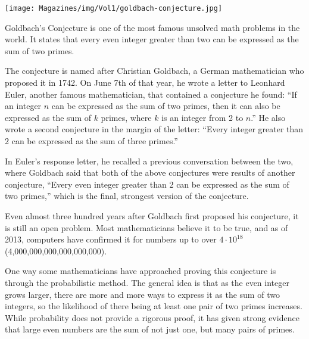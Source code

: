 \documentclass{article}
\begin{document}
\begin{multicols}{3}{


\begin{center}
    \texttt{[image: Magazines/img/Vol1/goldbach-conjecture.jpg]}
\end{center}

Goldbach’s Conjecture is one of the most famous unsolved math problems in the world. It states that every even integer greater than two can be expressed as the sum of two primes. 

The conjecture is named after Christian Goldbach, a German mathematician who proposed it in 1742. On June 7th of that year, he wrote a letter to Leonhard Euler, another famous mathematician, that contained a conjecture he found: ``If an integer $n$ can be expressed as the sum of two primes, then it can also be expressed as the sum of $k$ primes, where $k$ is an integer from 2 to $n$.'' He also wrote a second conjecture in the margin of the letter: ``Every integer greater than 2 can be expressed as the sum of three primes.'' 

In Euler’s response letter, he recalled a previous conversation between the two, where Goldbach said that both of the above conjectures were results of another conjecture, ``Every even integer greater than 2 can be expressed as the sum of two primes,'' which is the final, strongest version of the conjecture.  

Even almost three hundred years after Goldbach first proposed his conjecture, it is still an open problem. Most mathematicians believe it to be true, and as of 2013, computers have confirmed it for numbers up to over $4\cdot10^{18}$ (4,000,000,000,000,000,000). 

One way some mathematicians have approached proving this conjecture is through the probabilistic method. The general idea is that as the even integer grows larger, there are more and more ways to express it as the sum of two integers, so the likelihood of there being at least one pair of two primes increases. While probability does not provide a rigorous proof, it has given strong evidence that large even numbers are the sum of not just one, but many pairs of primes.

}
\end{multicols}
\end{document}
